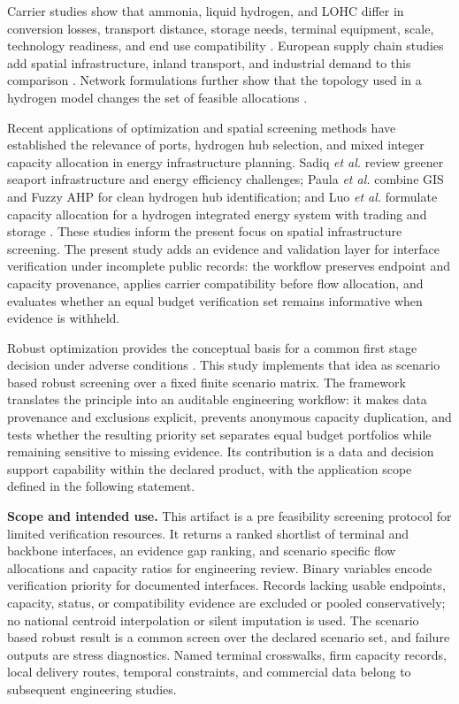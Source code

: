 \documentclass{ieeeaccess}
\newcommand{\LOHC}{LOHC}
\begin{document}
Carrier studies show that ammonia, liquid hydrogen, and \LOHC{} differ in conversion losses, transport distance, storage needs, terminal equipment, scale, technology readiness, and end use compatibility \cite{Raab2021,Johnston2022,Lee2022,Sterner2024,RestelliNH3,RestelliLH2,Spatolisano2024,Peecock2024,Wolf2024}. European supply chain studies add spatial infrastructure, inland transport, and industrial demand to this comparison \cite{Ganter2024,Kountouris2024,Eissler2025,Rey2025,GanterESNT2025}. Network formulations further show that the topology used in a hydrogen model changes the set of feasible allocations \cite{He2021,Jiang2022}.

Recent applications of optimization and spatial screening methods have established the relevance of ports, hydrogen hub selection, and mixed integer capacity allocation in energy infrastructure planning. Sadiq \emph{et al.} review greener seaport infrastructure and energy efficiency challenges; Paula \emph{et al.} combine GIS and Fuzzy AHP for clean hydrogen hub identification; and Luo \emph{et al.} formulate capacity allocation for a hydrogen integrated energy system with trading and storage \cite{Sadiq2021,Paula2025,LuoHIES2023}. These studies inform the present focus on spatial infrastructure screening. The present study adds an evidence and validation layer for interface verification under incomplete public records: the workflow preserves endpoint and capacity provenance, applies carrier compatibility before flow allocation, and evaluates whether an equal budget verification set remains informative when evidence is withheld.

Robust optimization provides the conceptual basis for a common first stage decision under adverse conditions \cite{BertsimasSim,BenTalRobust}. This study implements that idea as scenario based robust screening over a fixed finite scenario matrix. The framework translates the principle into an auditable engineering workflow: it makes data provenance and exclusions explicit, prevents anonymous capacity duplication, and tests whether the resulting priority set separates equal budget portfolios while remaining sensitive to missing evidence. Its contribution is a data and decision support capability within the declared product, with the application scope defined in the following statement.

\noindent\textbf{Scope and intended use.} This artifact is a pre feasibility screening protocol for limited verification resources. It returns a ranked shortlist of terminal and backbone interfaces, an evidence gap ranking, and scenario specific flow allocations and capacity ratios for engineering review. Binary variables encode verification priority for documented interfaces. Records lacking usable endpoints, capacity, status, or compatibility evidence are excluded or pooled conservatively; no national centroid interpolation or silent imputation is used. The scenario based robust result is a common screen over the declared scenario set, and failure outputs are stress diagnostics. Named terminal crosswalks, firm capacity records, local delivery routes, temporal constraints, and commercial data belong to subsequent engineering studies.
\end{document}
